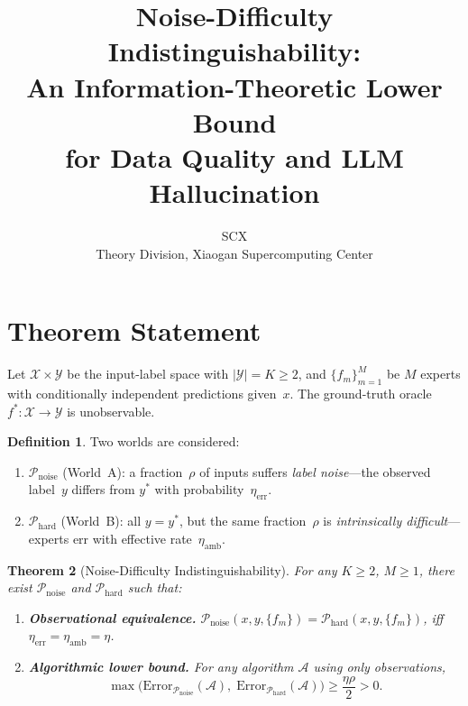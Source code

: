 \documentclass[10pt,a4paper]{article}
\title{\bfseries\large Noise-Difficulty Indistinguishability:\\An Information-Theoretic Lower Bound\\for Data Quality and LLM Hallucination}
\author{SCX\\{\small Theory Division, Xiaogan Supercomputing Center}}
\date{}
\newtheorem{theorem}{Theorem}[section]
\theoremstyle{definition}
\newtheorem{definition}[theorem]{Definition}
\theoremstyle{remark}
\begin{document}
\maketitle
\thispagestyle{empty}
\vspace{-8mm}

\section{Theorem Statement}

Let $\mathcal{X}\times\mathcal{Y}$ be the input-label space with $|\mathcal{Y}|=K\geq2$,
and $\{f_m\}_{m=1}^M$ be $M$ experts with conditionally independent predictions given~$x$.
The ground-truth oracle $f^*:\mathcal{X}\to\mathcal{Y}$ is unobservable.

\begin{definition}
Two worlds are considered:
\begin{enumerate}[label=(\roman*)]
  \item $\mathcal{P}_{\text{noise}}$ (World~A): a fraction~$\rho$ of inputs suffers
        \emph{label noise}---the observed label~$y$ differs from $y^*$ with probability~$\eta_{\text{err}}$.
  \item $\mathcal{P}_{\text{hard}}$ (World~B): all $y=y^*$, but the same fraction~$\rho$
        is \emph{intrinsically difficult}---experts err with effective rate~$\eta_{\text{amb}}$.
\end{enumerate}
\end{definition}

\begin{theorem}[Noise-Difficulty Indistinguishability]\label{thm:main}
For any $K\geq2$, $M\geq1$, there exist $\mathcal{P}_{\text{noise}}$ and $\mathcal{P}_{\text{hard}}$ such that:
\begin{enumerate}[label=(\arabic*)]
  \item \textbf{Observational equivalence.}
        $\mathcal{P}_{\text{noise}}(x,y,\{f_m\}) = \mathcal{P}_{\text{hard}}(x,y,\{f_m\})$,
        \emph{iff} $\eta_{\text{err}}=\eta_{\text{amb}}=\eta$.
        \label{item:equiv}

  \item \textbf{Algorithmic lower bound.}
        For any algorithm $\mathcal{A}$ using only observations,
        \begin{equation}\label{eq:bound}
        \max\bigl(\mathrm{Error}_{\mathcal{P}_{\text{noise}}}(\mathcal{A}),\;
                   \mathrm{Error}_{\mathcal{P}_{\text{hard}}}(\mathcal{A})\bigr)
        \ge \frac{\eta\rho}{2}>0.
        \end{equation}
        \label{item:bound}
\end{enumerate}
\end{theorem}
\end{document}
